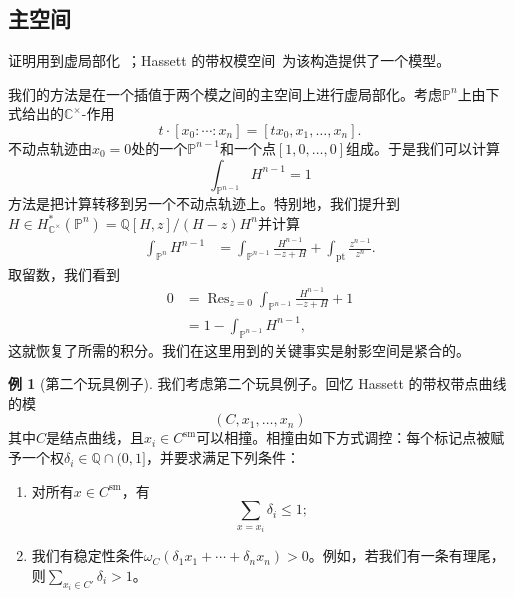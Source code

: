 \documentclass{amsart}
\theoremstyle{definition}
\newtheorem{exm}[thm]{例}
\theoremstyle{remark}
\theoremstyle{plain}
\theoremstyle{definition}
\theoremstyle{remark}
\newcommand{\C}{\mathbb{C}}
\newcommand{\Q}{\mathbb{Q}}
\renewcommand{\P}{\mathbb{P}}
\newcommand{\mr}[1]{\mathrm{#1}}
\newcommand{\on}[1]{\operatorname{#1}}
\newcommand{\1}{\mathbf{1}}
\newcommand{\2}{\mathbf{2}}
\newcommand{\3}{\mathbf{3}}
\begin{document}
\subsection{主空间}%
\label{sub:Master space}

证明用到虚局部化~\cite{GP1999}；Hassett 的带权模空间~\cite{Hassett2003}为该构造提供了一个模型。

我们的方法是在一个插值于两个模之间的主空间上进行虚局部化。考虑\(\P^n\)上由下式给出的\(\C^{\times}\)-作用
\[ t \cdot [x_0 : \cdots : x_n] = [t x_0, x_1, \ldots, x_n]. \]
不动点轨迹由\(x_0 = 0\)处的一个\(\P^{n-1}\)和一个点\([1, 0, \ldots, 0]\)组成。于是我们可以计算
\[ \int_{\P^{n-1}} H^{n-1} = 1 \]
方法是把计算转移到另一个不动点轨迹上。特别地，我们提升到\(H \in H_{\C^{\times}}^* (\P^n) = \Q[H,z] / (H-z)H^n\)并计算
\begin{align*}
    \int_{\P^n} H^{n-1} &= \int_{\P^{n-1}} \frac{H^{n-1}}{-z+H} + \int_{\mr{pt}} \frac{z^{n-1}}{z^n}.
\end{align*}
取留数，我们看到
\begin{align*}
    0 &= \on{Res}_{z = 0}\int_{\P^{n-1}} \frac{H^{n-1}}{-z+H} + 1 \\
    &= 1 - \int_{\P^{n-1}}H^{n-1},
\end{align*}
这就恢复了所需的积分。我们在这里用到的关键事实是射影空间是紧合的。

\begin{exm}[第二个玩具例子]
    我们考虑第二个玩具例子。回忆 Hassett 的带权带点曲线的模
    \[ (C, x_1, \ldots, x_n) \]
    其中\(C\)是结点曲线，且\(x_i \in C^{\mr{sm}}\)可以相撞。相撞由如下方式调控：每个标记点被赋予一个权\(\delta_i \in \Q \cap (0,1]\)，并要求满足下列条件：
    \begin{enumerate}
        \item 对所有\(x \in C^{\mr{sm}}\)，有
            \[ \sum_{x = x_i} \delta_i \leq 1; \]
        \item 我们有稳定性条件\(\omega_C(\delta_1 x_1 + \cdots + \delta_n x_n) > 0\)。例如，若我们有一条有理尾，则\(\sum_{x_i \in C'} \delta_i > 1\)。
    \end{enumerate}
\end{exm}
\end{document}
